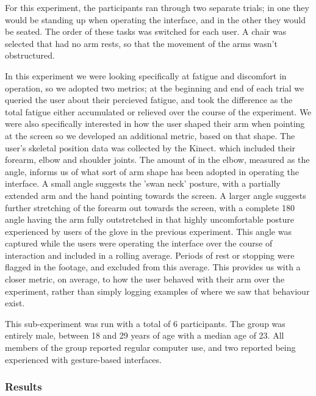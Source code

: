 
For this experiment, the participants ran through two separate trials; in one they would be standing up when operating the interface, and in the other they would be seated. The order of these tasks was switched for each user. A chair was selected that had no arm rests, so that the movement of the arms wasn't obstructured.

In this experiment we were looking specifically at fatigue and discomfort in operation, so we adopted two metrics; at the beginning and end of each trial we queried the user about their percieved fatigue, and took the difference as the total fatigue either accumulated or relieved over the course of the experiment. We were also specifically interested in how the user shaped their arm when pointing at the screen so we developed an additional metric, based on that shape. The user's skeletal position data was collected by the Kinect. which included their forearm, elbow and shoulder joints. The amount of in the elbow, measured as the angle, informs us of what sort of arm shape has been adopted in operating the interface. A small angle suggests the 'swan neck' posture, with a partially extended arm and the hand pointing towards the screen. A larger angle suggests further stretching of the forearm out towards the screen, with a complete 180 angle having the arm fully outstretched in that highly uncomfortable posture experienced by users of the glove in the previous experiment. This angle was captured while the users were operating the interface over the course of interaction and included in a rolling average. Periods of rest or stopping were flagged in the footage, and excluded from this average. This provides us with a closer metric, on average, to how the user behaved with their arm over the experiment, rather than simply logging examples of where we saw that behaviour exist.

This sub-experiment was run with a total of 6 participants. The group was entirely male, between 18 and 29 years of age with a median age of 23. All members of the group reported regular computer use, and two reported being experienced with gesture-based interfaces.

\subsubsection{Results}

